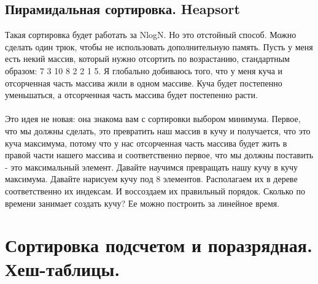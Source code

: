 \documentclass[a4paper,12pt]{article}
\begin{document}
\subsection{Пирамидальная сортировка. Heapsort}
Такая сортировка будет работать за NlogN. Но это отстойный способ. Можно сделать один трюк, чтобы не использовать дополнительную память. Пусть у меня есть некий массив, который нужно отсортить по возрастанию, стандартным образом: 7 3 10 8 2 2 1 5. Я глобально добиваюсь того, что у меня куча и отсорченная часть массива жили в одном массиве. Куча будет постепенно уменьшаться, а отсорченная часть массива будет постепенно расти. \\ \\ Это идея не новая: она знакома вам с сортировки выбором минимума. Первое, что мы должны сделать, это превратить наш массив в кучу и получается, что это куча максимума, потому что у нас отсорченная часть массива будет жить в правой части нашего массива и соответственно первое, что мы должны поставить - это максимальный элемент. Давайте научимся превращать нашу кучу в кучу максимума. Давайте нарисуем кучу под 8 элементов. Располагаем их в дереве соответственно их индексам. И воссоздаем их правильный порядок. Сколько по времени занимает создать кучу? Ее можно построить за линейное время.
\newpage
\section{Сортировка подсчетом и поразрядная. Хеш-таблицы.}
\end{document}
